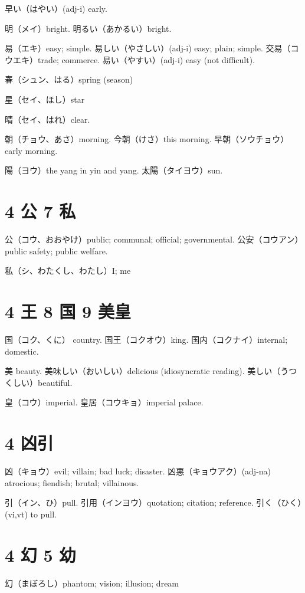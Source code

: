 早い（はやい）(adj-i) early.

明（メイ）bright.
明るい（あかるい）bright.

易（エキ）easy; simple.
易しい（やさしい）(adj-i) easy; plain; simple.
交易（コウエキ）trade; commerce.
易い（やすい）(adj-i) easy (not difficult).

春（シュン、はる）spring (season)

星（セイ、ほし）star

晴（セイ、はれ）clear.

朝（チョウ、あさ）morning.
今朝（けさ）this morning.
早朝（ソウチョウ）early morning.

陽（ヨウ）the yang in yin and yang.
太陽（タイヨウ）sun.

\section{4 公 7 私}

公（コウ、おおやけ）public; communal; official; governmental.
公安（コウアン）public safety; public welfare.

私（シ、わたくし、わたし）I; me

\section{4 王 8 国 9 美皇}

国（コク、くに） country.
国王（コクオウ）king.
国内（コクナイ）internal; domestic.

美 beauty.
美味しい（おいしい）delicious (idiosyncratic reading).
美しい（うつくしい）beautiful.

皇（コウ）imperial.
皇居（コウキョ）imperial palace.

\section{4 凶引}

凶（キョウ）evil; villain; bad luck; disaster.
凶悪（キョウアク）(adj-na) atrocious; fiendish; brutal; villainous.

引（イン、ひ）pull.
引用（インヨウ）quotation; citation; reference.
引く（ひく）(vi,vt) to pull.

\section{4 幻 5 幼}

幻（まぼろし）phantom; vision; illusion; dream

